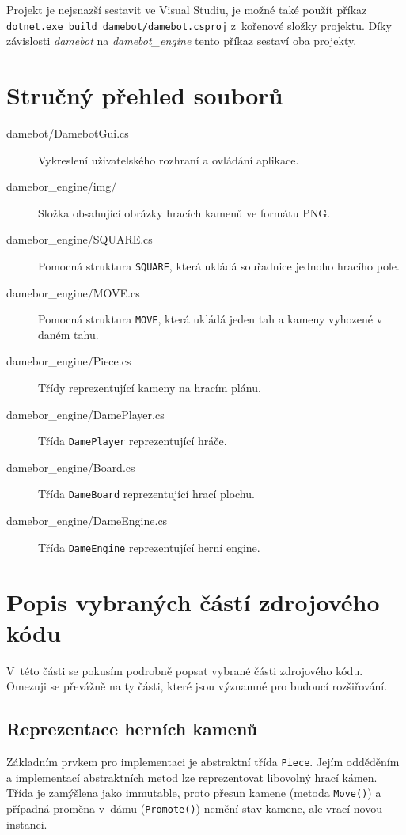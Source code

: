 \documentclass[a4paper,12pt]{article}
\renewcommand{\tt}[1]{\texttt{#1}}
\begin{document}
	Projekt je nejsnazší sestavit ve Visual Studiu, je možné také použít příkaz \verb|dotnet.exe build damebot/damebot.csproj| z~kořenové složky projektu. Díky závislosti \textit{damebot} na \textit{damebot\_engine} tento příkaz sestaví oba projekty.
	
	\section{Stručný přehled souborů}
	\begin{description}
		\item[damebot/DamebotGui.cs]Vykreslení uživatelského rozhraní a ovládání aplikace.
		\item[damebor\_engine/img/] Složka obsahující obrázky hracích kamenů ve formátu PNG.
		\item[damebor\_engine/SQUARE.cs]  Pomocná struktura \tt{SQUARE}, která ukládá souřadnice jednoho hracího pole.
		\item[damebor\_engine/MOVE.cs] Pomocná struktura \tt{MOVE}, která ukládá jeden tah a kameny vyhozené v daném tahu.
		\item[damebor\_engine/Piece.cs] Třídy reprezentující kameny na hracím plánu.
		\item[damebor\_engine/DamePlayer.cs] Třída \tt{DamePlayer} reprezentující hráče.
		\item[damebor\_engine/Board.cs] Třída \tt{DameBoard} reprezentující hrací plochu.
		\item[damebor\_engine/DameEngine.cs] Třída \tt{DameEngine} reprezentující herní engine.
	\end{description}
	
	\section{Popis vybraných částí zdrojového kódu}
	V~této části se pokusím podrobně popsat vybrané části zdrojového kódu.
	Omezuji se převážně na ty části, které jsou významné pro budoucí rozšiřování.
	
	\subsection{Reprezentace herních kamenů}
	Základním prvkem pro implementaci je abstraktní třída \tt{Piece}. Jejím odděděním a implementací abstraktních metod lze reprezentovat libovolný hrací kámen. Třída je zamýšlena jako immutable, proto přesun kamene (metoda \tt{Move()}) a případná proměna v~dámu (\tt{Promote()}) nemění stav kamene, ale vrací novou instanci.
	
\end{document}
